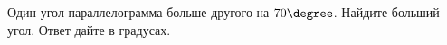 \begin{ex}
	\begin{condition}
		Один угол параллелограмма больше другого на \( 70 \degree \). Найдите больший угол. Ответ дайте в градусах.
	\end{condition}
\end{ex}